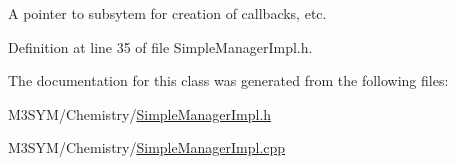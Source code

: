 A pointer to subsytem for creation of callbacks, etc. 



Definition at line 35 of file Simple\+Manager\+Impl.\+h.



The documentation for this class was generated from the following files\+:\begin{DoxyCompactItemize}
\item 
M3\+S\+Y\+M/\+Chemistry/\hyperlink{SimpleManagerImpl_8h}{Simple\+Manager\+Impl.\+h}\item 
M3\+S\+Y\+M/\+Chemistry/\hyperlink{SimpleManagerImpl_8cpp}{Simple\+Manager\+Impl.\+cpp}\end{DoxyCompactItemize}
